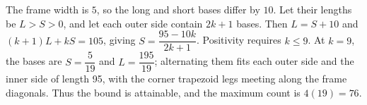 The frame width is $5$, so the long and short bases differ by $10$. Let their lengths be $L>S>0$, and let each outer side contain $2k+1$ bases. Then $L=S+10$ and $(k+1)L+kS=105$, giving $S=\dfrac{95-10k}{2k+1}$. Positivity requires $k\le9$. At $k=9$, the bases are $S=\dfrac{5}{19}$ and $L=\dfrac{195}{19}$; alternating them fits each outer side and the inner side of length 95, with the corner trapezoid legs meeting along the frame diagonals. Thus the bound is attainable, and the maximum count is $4(19)=\boxed{76}$.
